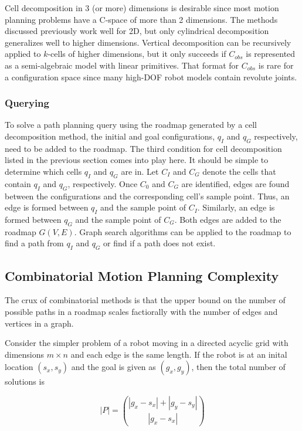 \documentclass[10pt,conference]{ieeeconf}
\begin{document}
Cell decomposition in 3 (or more) dimensions is desirable since most motion planning problems have a C-space of more than 2 dimensions. The methods discussed previously work well for 2D, but only cylindrical decomposition generalizes well to higher dimensions. Vertical decomposition can be recursively applied to $k$-cells of higher dimensions, but it only succeeds if $C_{obs}$ is represented as a semi-algebraic model with linear primitives. That format for $C_{obs}$ is rare for a configuration space since many high-DOF robot models contain revolute joints.

\subsubsection{Querying}

To solve a path planning query using the roadmap generated by a cell decomposition method, the initial and goal configurations, $q_I$ and $q_G$ respectively, need to be added to the roadmap. The third condition for cell decomposition listed in the previous section comes into play here. It should be simple to determine which cells $q_I$ and $q_G$ are in. Let $C_I$ and $C_G$ denote the cells that contain $q_I$ and $q_G$, respectively. Once $C_0$ and $C_G$ are identified, edges are found between the configurations and the corresponding cell's sample point. Thus, an edge is formed between $q_I$ and the sample point of $C_I$. Similarly, an edge is formed between $q_G$ and the sample point of $C_G$. Both edges are added to the roadmap $G(V,E)$. Graph search algorithms can be applied to the roadmap to find a path from $q_I$ and $q_G$ or find if a path does not exist.


\subsection{Combinatorial Motion Planning Complexity}

The crux of combinatorial methods is that the upper bound on the number of possible paths in a roadmap scales factiorally with the number of edges and vertices in a graph. 

Consider the simpler problem of a robot moving in a directed acyclic grid with dimensions $m \times n$ and each edge is the same length. If the robot is at an inital location $(s_x, s_y)$ and the goal is given as $(g_x, g_y)$, then the total number of solutions is 

\begin{equation}\label{eq:comb_complex}
|P| = { |g_x-s_x|+|g_y-s_y| \choose |g_x-s_x| }
\end{equation}
\end{document}
